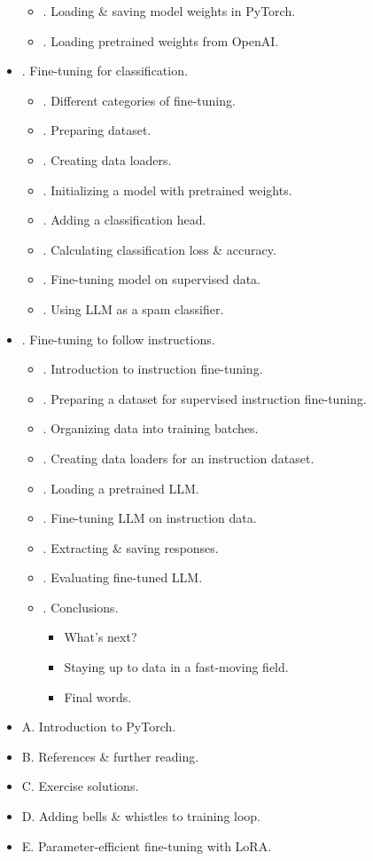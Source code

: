 \documentclass{article}
\begin{document}
\begin{itemize}
\begin{itemize}
\begin{itemize}
		\end{itemize}
		\item {. Loading \& saving model weights in PyTorch.}
		\item {. Loading pretrained weights from OpenAI.}
	\end{itemize}
	\item {. Fine-tuning for classification.}
	\begin{itemize}
		\item {. Different categories of fine-tuning.}
		\item {. Preparing dataset.}
		\item {. Creating data loaders.}
		\item {. Initializing a model with pretrained weights.}
		\item {. Adding a classification head.}
		\item {. Calculating classification loss \& accuracy.}
		\item {. Fine-tuning model on supervised data.}
		\item {. Using LLM as a spam classifier.}
	\end{itemize}
	\item {. Fine-tuning to follow instructions.}
	\begin{itemize}
		\item {. Introduction to instruction fine-tuning.}
		\item {. Preparing a dataset for supervised instruction fine-tuning.}
		\item {. Organizing data into training batches.}
		\item {. Creating data loaders for an instruction dataset.}
		\item {. Loading a pretrained LLM.}
		\item {. Fine-tuning LLM on instruction data.}
		\item {. Extracting \& saving responses.}
		\item {. Evaluating fine-tuned LLM.}
		\item {. Conclusions.}
		\begin{itemize}
			\item {\sf What's next?}
			\item {\sf Staying up to data in a fast-moving field.}
			\item {\sf Final words.}
		\end{itemize}
	\end{itemize}
	\item {\sf A. Introduction to PyTorch.}
	\item {\sf B. References \& further reading.}
	\item {\sf C. Exercise solutions.}
	\item {\sf D. Adding bells \& whistles to training loop.}
	\item {\sf E. Parameter-efficient fine-tuning with LoRA.}
\end{itemize}
\end{document}
